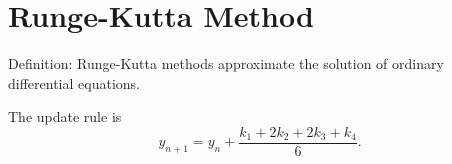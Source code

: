 \section{Runge-Kutta Method}

Definition: Runge-Kutta methods approximate the solution of ordinary differential equations.

The update rule is
\[
y_{n+1} = y_n + \frac{k_1 + 2k_2 + 2k_3 + k_4}{6}.
\]
